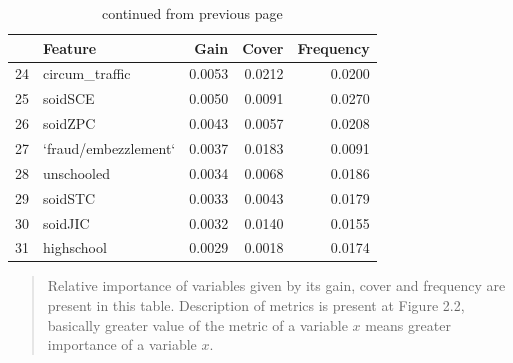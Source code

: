 \documentclass[12pt, twoside,openany]{book} %
\begin{document}
\begin{appendices}
\begin{table}[ht]
\centering
\begin{tabular}{rlrrr}
  \hline
 & Feature & Gain & Cover & Frequency \\ 
  \hline
24 & circum\_traffic & 0.0053 & 0.0212 & 0.0200 \\ 
  25 & soidSCE & 0.0050 & 0.0091 & 0.0270 \\ 
  26 & soidZPC & 0.0043 & 0.0057 & 0.0208 \\ 
  27 & `fraud/embezzlement` & 0.0037 & 0.0183 & 0.0091 \\ 
  28 & unschooled & 0.0034 & 0.0068 & 0.0186 \\ 
  29 & soidSTC & 0.0033 & 0.0043 & 0.0179 \\ 
  30 & soidJIC & 0.0032 & 0.0140 & 0.0155 \\ 
  31 & highschool & 0.0029 & 0.0018 & 0.0174 \\ 
   \hline
\end{tabular}
\renewcommand\thetable{C.1}
 \caption{continued from previous page}
\medskip
{\small 
\begin{quotation}
Relative importance of variables given by its gain, cover and frequency are present in this table. Description of metrics is present at Figure 2.2, basically greater value of the metric of a variable $x$ means greater importance of a variable $x$. 
\end{quotation}
}

\end{table}








\end{appendices}
\end{document}
